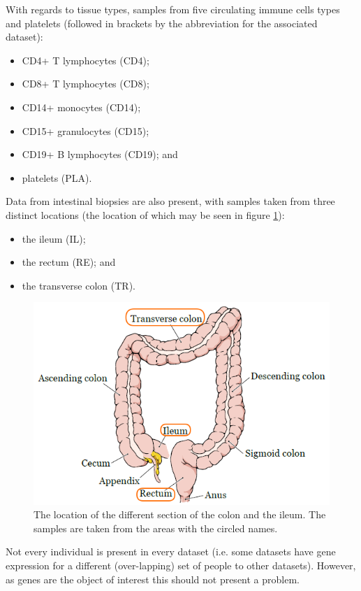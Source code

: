 \documentclass[14pt]{extarticle} %
\begin{document}
	With regards to tissue types, samples from five circulating immune cells types and platelets (followed in brackets by the abbreviation for the associated dataset):
	\begin{itemize}
		\item CD4+ T lymphocytes (CD4);
		\item CD8+ T lymphocytes (CD8);
		\item CD14+ monocytes (CD14);
		\item CD15+ granulocytes (CD15);
		\item CD19+ B lymphocytes (CD19); and 
		\item platelets (PLA).
	\end{itemize}
	Data from intestinal biopsies are also present, with samples taken from three distinct locations (the location of which may be seen in figure \ref{fig:colon_location}):
	\begin{itemize}
		\item the ileum (IL);
		\item the rectum (RE); and
		\item the transverse colon (TR).
	\end{itemize} 

	\begin{figure}[h]
		\centering
		\includegraphics[scale=0.55]{Images/colon_highlight.png}
		\caption{The location of the different section of the colon and the ileum. The samples are taken from the areas with the circled names.}
		\label{fig:colon_location}
	\end{figure}
	

	Not every individual is present in every dataset (i.e. some datasets have gene expression for a different (over-lapping) set of people to other datasets). However, as genes are the object of interest this should not present a problem.
	
\end{document}

